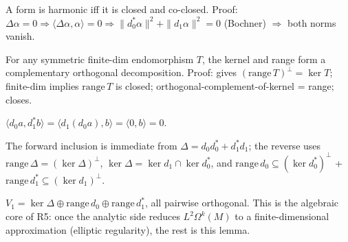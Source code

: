 \begin{lemma}[Pass hod.53: $\ker\Delta = \ker d_{1}\cap\ker d_{0}^{*}$ (real, finite-dim)]
\label{lem:hod-r53}
A form is harmonic iff it is closed and co-closed.  Proof: $\Delta\alpha=0 \Rightarrow \langle\Delta\alpha,\alpha\rangle=0 \Rightarrow \|d_{0}^{*}\alpha\|^{2}+\|d_{1}\alpha\|^{2}=0$ (Bochner) $\Rightarrow$ both norms vanish.
\leanok\mathlibok
\end{lemma}

\begin{lemma}[Pass hod.54: $V_{1} = \ker\Delta\oplus\mathrm{range}\,\Delta$ (real, finite-dim)]
\label{lem:hod-r54}
For any symmetric finite-dim endomorphism $T$, the kernel and range form a complementary orthogonal decomposition.  Proof:  gives $(\mathrm{range}\,T)^{\perp}=\ker T$; finite-dim implies $\mathrm{range}\,T$ is closed; orthogonal-complement-of-kernel = range;  closes.
\leanok\mathlibok
\end{lemma}

\begin{lemma}[Pass hod.55: $\mathrm{range}\,d_{0} \perp \mathrm{range}\,d_{1}^{*}$ (uses $d^{2}=0$)]
\label{lem:hod-r55}
$\langle d_{0}a, d_{1}^{*}b\rangle = \langle d_{1}(d_{0}a),b\rangle = \langle 0,b\rangle = 0$.
\leanok\mathlibok
\end{lemma}

\begin{lemma}[Pass hod.56: $\mathrm{range}\,\Delta = \mathrm{range}\,d_{0}\oplus\mathrm{range}\,d_{1}^{*}$]
\label{lem:hod-r56}
The forward inclusion is immediate from $\Delta=d_{0}d_{0}^{*}+d_{1}^{*}d_{1}$; the reverse uses $\mathrm{range}\,\Delta = (\ker\Delta)^{\perp}$, $\ker\Delta = \ker d_{1}\cap\ker d_{0}^{*}$, and $\mathrm{range}\,d_{0}\subseteq(\ker d_{0}^{*})^{\perp}$ + $\mathrm{range}\,d_{1}^{*}\subseteq(\ker d_{1})^{\perp}$.
\leanok\mathlibok
\end{lemma}

\begin{lemma}
\label{lem:hod-r57}
$V_{1} = \ker\Delta\oplus\mathrm{range}\,d_{0}\oplus\mathrm{range}\,d_{1}^{*}$, all pairwise orthogonal.  This is the algebraic core of R5: once the analytic side reduces $L^{2}\Omega^{k}(M)$ to a finite-dimensional approximation (elliptic regularity), the rest is this lemma.
\leanok\mathlibok
\end{lemma}

